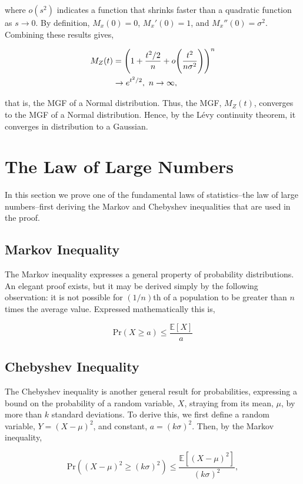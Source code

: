 \documentclass[11pt]{amsart}
\begin{document}
where $o(s^2)$ indicates a function that shrinks faster than a quadratic function as $s \to 0$. By definition, $M_x(0) = 0$, $M_x'(0) = 1$, and $M_x''(0) = \sigma^2$. Combining these results gives,

\begin{align}
M_Z(t) &= \Bigg(1 + \frac{t^2/2}{n} + o\Bigg(\frac{t^2}{n\sigma^2}\Bigg)\Bigg)^n \notag \\
&\to e^{t^2/2}, \ n \to \infty, \notag
\end{align}

that is, the MGF of a Normal distribution. Thus, the MGF, $M_Z(t)$, converges to the MGF of a Normal distribution. Hence, by the L\'evy continuity theorem, it converges in distribution to a Gaussian.

\section{The Law of Large Numbers}

In this section we prove one of the fundamental laws of statistics--the law of large numbers--first deriving the Markov and Chebyshev inequalities that are used in the proof.

\subsection{Markov Inequality}

The Markov inequality expresses a general property of probability distributions. An elegant proof exists, but it may be derived simply by the following observation: it is not possible for $(1/n)$th of a population to be greater than $n$ times the average value. Expressed mathematically this is,

$$\text{Pr}(X \geq a) \leq \frac{\mathbb{E}[X]}{a}$$

\subsection{Chebyshev Inequality}

The Chebyshev inequality is another general result for probabilities, expressing a bound on the probability of a random variable, $X$, straying from its mean, $\mu$, by more than $k$ standard deviations. To derive this, we first define a random variable, $Y = (X - \mu)^2$, and constant, $a = (k\sigma)^2$. Then, by the Markov inequality,

$$\text{Pr}((X - \mu)^2 \geq (k\sigma)^2) \leq \frac{\mathbb{E}[(X - \mu)^2]}{(k\sigma)^2},$$
\end{document}
